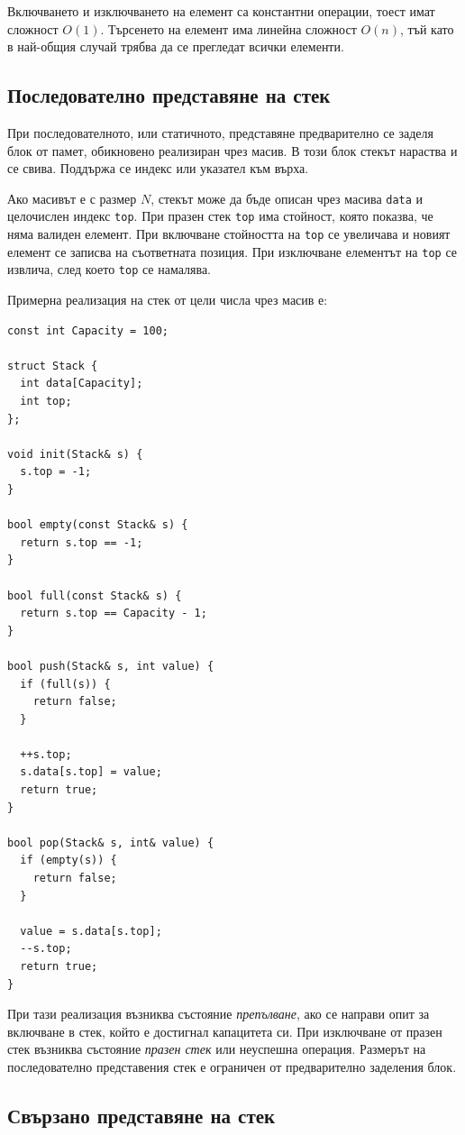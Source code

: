 Включването и изключването на елемент са константни операции, тоест имат сложност $O(1)$. Търсенето на елемент има линейна сложност $O(n)$, тъй като в най-общия случай трябва да се прегледат всички елементи.

\subsection{Последователно представяне на стек}\label{s:18.3.1}

При последователното, или статичното, представяне предварително се заделя блок от памет, обикновено реализиран чрез масив. В този блок стекът нараства и се свива. Поддържа се индекс или указател към върха.

Ако масивът е с размер $N$, стекът може да бъде описан чрез масива \verb|data| и целочислен индекс \verb|top|. При празен стек \verb|top| има стойност, която показва, че няма валиден елемент. При включване стойността на \verb|top| се увеличава и новият елемент се записва на съответната позиция. При изключване елементът на \verb|top| се извлича, след което \verb|top| се намалява.

Примерна реализация на стек от цели числа чрез масив е:

\begin{verbatim}
const int Capacity = 100;

struct Stack {
  int data[Capacity];
  int top;
};

void init(Stack& s) {
  s.top = -1;
}

bool empty(const Stack& s) {
  return s.top == -1;
}

bool full(const Stack& s) {
  return s.top == Capacity - 1;
}

bool push(Stack& s, int value) {
  if (full(s)) {
    return false;
  }

  ++s.top;
  s.data[s.top] = value;
  return true;
}

bool pop(Stack& s, int& value) {
  if (empty(s)) {
    return false;
  }

  value = s.data[s.top];
  --s.top;
  return true;
}
\end{verbatim}

При тази реализация възниква състояние \emph{препълване}, ако се направи опит за включване в стек, който е достигнал капацитета си. При изключване от празен стек възниква състояние \emph{празен стек} или неуспешна операция. Размерът на последователно представения стек е ограничен от предварително заделения блок.

\subsection{Свързано представяне на стек}\label{s:18.3.2}

